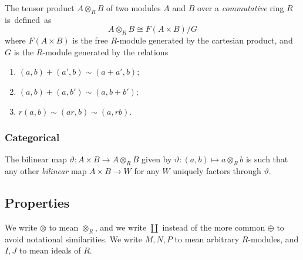 \documentclass[10pt]{article}
\begin{document}
                The tensor product $A\otimes_R B$ of two modules $A$ and $B$ over a \emph{commutative} ring $R$ \mbox{is defined as}
                \begin{equation*}
                    A\otimes_R B \cong  F(A\times B)/G
                \end{equation*}
                where $F(A\times B)$ is the free $R$-module generated by the cartesian product, and $G$ is the $R$-module generated by the relations
                \begin{enumerate}
                    \item $(a,b)+(a',b)\sim(a+a',b)$;
                    \item $(a,b)+(a,b')\sim(a,b+b')$;
                    \item $r(a,b)\sim (ar,b)\sim (a,rb)$.
                \end{enumerate}


            \subsubsection{Categorical}

                The bilinear map $\vartheta\colon A\times B\to A\otimes_R B$ given by $\vartheta\colon(a,b)\mapsto a\otimes_R b$ is such that any other \emph{bilinear} map $A\times B\to W$ for any $W$ uniquely factors through $\vartheta$.

        \subsection{Properties}

            We write $\otimes$ to mean $\otimes_R$, and we write $\coprod$ instead of the more common $\oplus$ to avoid notational similarities.
            We write $M,N,P$ to mean arbitrary $R$-modules, and $I,J$ to mean ideals of $R$.
\end{document}
